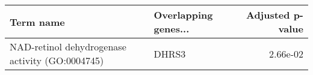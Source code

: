\begin{tabular}{llr}
\toprule
                                      Term name & Overlapping genes... &  Adjusted p-value \\
\midrule
NAD-retinol dehydrogenase activity (GO:0004745) &                DHRS3 &          2.66e-02 \\
\bottomrule
\end{tabular}
